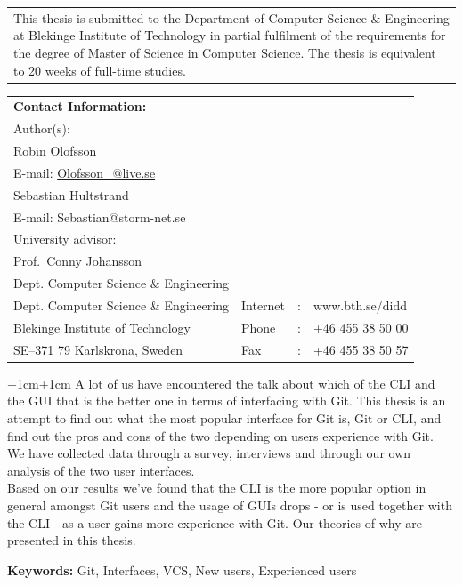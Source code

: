 \documentclass[a4paper,oneside]{bth} %
\begin{document}
		{\pagestyle{empty}
			\changepage{5cm}{1cm}{-0.5cm}{-0.5cm}{}{-2cm}{}{}{}
			\noindent%
			\begin{tabular}{p{\textwidth}}
				{\small This thesis is submitted to the Department of Computer Science \& Engineering at Blekinge Institute of Technology in partial fulfilment of the requirements for the degree of Master of Science in Computer Science. The thesis is equivalent to 20 weeks of full-time studies.}
			\end{tabular}
			\par\vspace {12cm}
			\noindent%
			\begin{tabular}{p{}lcl}
				\textbf{Contact Information:}\\
				Author(s):
				\\
				Robin Olofsson
				\\
				E-mail: \url{Olofsson_@live.se}
				\\
				Sebastian Hultstrand
				\\
				E-mail: Sebastian@storm-net.se
				\\
				\par\vspace {5cm}
				University advisor:
				\\
				Prof.\ Conny Johansson
				\\
				Dept. Computer Science \& Engineering
				\par\vspace {1cm}
				\noindent%
 				\\
				Dept. Computer Science \& Engineering & Internet & : & www.bth.se/didd\\
				Blekinge Institute of Technology & Phone	& : & +46 455 38 50 00 \\
				SE--371 79 Karlskrona, Sweden & Fax & : & +46 455 38 50 57 \\
			\end{tabular}
			\clearpage
		} %

		\setcounter{page}{1}

		\abstract
		\begin{changemargin}{+1cm}{+1cm}
			\noindent
				A lot of us have encountered the talk about which of the CLI and the GUI that is the better one in terms of interfacing with Git.
				This thesis is an attempt to find out what the most popular interface for Git is, Git or CLI, and find out the pros and cons of the two depending on users experience with Git.\\
				We have collected data through a survey, interviews and through our own analysis of the two user interfaces.\\
				Based on our results we've found that the CLI is the more popular option in general amongst Git users and the usage of GUIs drops - or is used together with the CLI - as a user gains more experience with Git.
				Our theories of why are presented in this thesis.
				

			\par\vspace {1cm}
			\noindent
			\textbf{Keywords:} Git, Interfaces, VCS, New users, Experienced users
		\end{changemargin}
\end{document}
